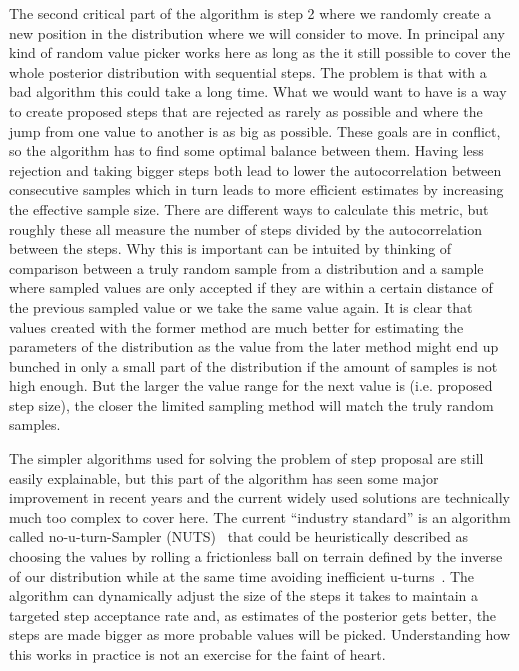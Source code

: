 \documentclass[12pt,a4paper,leqno]{report}
\theoremstyle{plain}
\theoremstyle{definition}
\theoremstyle{remark}
\begin{document}
The second critical part of the algorithm is step 2 where we randomly create a new
position in the distribution where we will consider to move. In principal any kind of
random value picker works here as long as the it still possible to cover the whole
posterior distribution with sequential steps. The problem is
that with a bad algorithm this could take a long time. What we would want to have is a
way to create proposed steps that are rejected as rarely as possible and where the
jump from one value to another is as big as possible. These goals are in
conflict, so the algorithm has to find some optimal balance between them.
Having less rejection and taking bigger steps both lead to lower the autocorrelation
between consecutive samples which in turn leads to more efficient estimates by increasing the
effective sample size. There are different ways to calculate this metric, but roughly
these all measure the number of steps divided by the autocorrelation between the steps.
Why this is important can be intuited by thinking of comparison between a truly
random sample from a distribution and a sample where sampled values are only accepted if they are within a certain distance of the
previous sampled value or we take the same value again. It is clear that values created
with the former method are much better for
estimating the parameters of the distribution as the value from the later method might
end up bunched in only a small part of the distribution if the amount of samples is not
high enough. But the larger the value range for the next value is (i.e. proposed step
size), the closer the limited sampling method will match the truly random samples.

The simpler algorithms used for solving the problem of step proposal are still easily explainable, but
this part of the algorithm has seen some major improvement in recent years and the
current widely used solutions are technically much too complex to cover here. The
current ``industry standard'' is an algorithm called no-u-turn-Sampler (NUTS)\ \cite{nuts}
that could be heuristically described as choosing the values by rolling a frictionless
ball on terrain defined by the inverse of our distribution while at the same time
avoiding inefficient u-turns\ \cite{kruschke}. The algorithm can dynamically adjust the
size of the steps it takes to maintain a targeted step acceptance rate and, as estimates of
the posterior gets better, the steps are made bigger as more probable values will be
picked. Understanding how this works in practice is not an exercise for the faint of heart.
\end{document}
